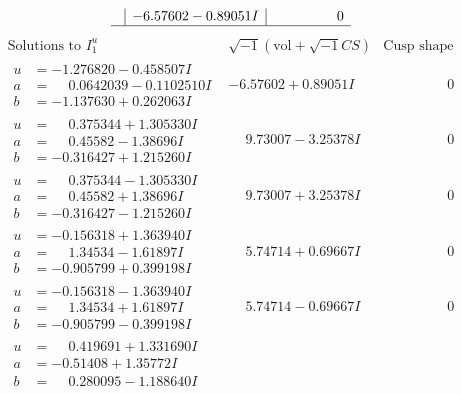 \documentclass[1p]{elsarticle_modified}
\theoremstyle{definition}
\newcommand{\I}{\sqrt{-1}}
\begin{document}
$$\begin{array}{c|c|c}
 & -6.57602 - 0.89051 I & \phantom{-0.000000 } 0\\
 \hline 
 \end{array}$$\newpage$$\begin{array}{c|c|c}  
\text{Solutions to }I^u_{1}& \I (\text{vol} + \sqrt{-1}CS) & \text{Cusp shape}\\
 \hline 
\begin{aligned}
u &= -1.276820 - 0.458507 I \\
a &= \phantom{-}0.0642039 - 0.1102510 I \\
b &= -1.137630 + 0.262063 I\end{aligned}
 & -6.57602 + 0.89051 I & \phantom{-0.000000 } 0 \\ \hline\begin{aligned}
u &= \phantom{-}0.375344 + 1.305330 I \\
a &= \phantom{-}0.45582 - 1.38696 I \\
b &= -0.316427 + 1.215260 I\end{aligned}
 & \phantom{-}9.73007 - 3.25378 I & \phantom{-0.000000 } 0 \\ \hline\begin{aligned}
u &= \phantom{-}0.375344 - 1.305330 I \\
a &= \phantom{-}0.45582 + 1.38696 I \\
b &= -0.316427 - 1.215260 I\end{aligned}
 & \phantom{-}9.73007 + 3.25378 I & \phantom{-0.000000 } 0 \\ \hline\begin{aligned}
u &= -0.156318 + 1.363940 I \\
a &= \phantom{-}1.34534 - 1.61897 I \\
b &= -0.905799 + 0.399198 I\end{aligned}
 & \phantom{-}5.74714 + 0.69667 I & \phantom{-0.000000 } 0 \\ \hline\begin{aligned}
u &= -0.156318 - 1.363940 I \\
a &= \phantom{-}1.34534 + 1.61897 I \\
b &= -0.905799 - 0.399198 I\end{aligned}
 & \phantom{-}5.74714 - 0.69667 I & \phantom{-0.000000 } 0 \\ \hline\begin{aligned}
u &= \phantom{-}0.419691 + 1.331690 I \\
a &= -0.51408 + 1.35772 I \\
b &= \phantom{-}0.280095 - 1.188640 I\end{aligned}

\end{array}$$
\end{document}
